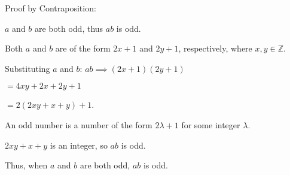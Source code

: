 \documentclass{article}
\newenvironment{Problem}
{\noindent\color{black}}
{\newline}
\newenvironment{Solution}
{\noindent\color{red}}
{\newline}
\begin{document}
\begin{Solution}
    Proof by Contraposition:

    \begin{adjustwidth}{2em}{0em}
        $a$ and $b$ are both odd, thus $ab$ is odd. 

        \phantom{ }

        Both $a$ and $b$ are of the form $2x + 1$ and $2y + 1$, 
        respectively, where $x,y \in \mathbb Z$. 

        \phantom{ }

        Substituting $a$ and $b$: $ab \implies (2x + 1)(2y + 1)$
        
        \hspace*{12em}$= 4xy + 2x + 2y + 1$ 
        
        \hspace*{12em}$= 2(2xy + x + y) + 1$.

        \phantom{ }

        An odd number is a number of the form $2\lambda + 1$
        for some integer $\lambda$.

        $2xy + x + y$ is an integer, so $ab$ is odd.

        \phantom{ }

        Thus, when $a$ and $b$ are both odd, $ab$ is odd.

    \end{adjustwidth}
    \phantom{ }
\end{Solution}




\end{document}

